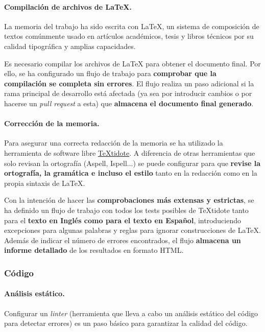 \paragraph*{Compilación de archivos de LaTeX.}

La memoria del trabajo ha sido escrita con LaTeX, un sistema de composición de textos comúnmente usado en artículos académicos, tesis y libros técnicos por su calidad tipográfica y amplias capacidades.

Es necesario compilar los archivos de LaTeX para obtener el documento final. Por ello, se ha configurado un flujo de trabajo para \textbf{comprobar que la compilación se completa sin errores}. El flujo realiza un paso adicional si la rama principal de desarrollo está afectada (ya sea por introducir cambios o por hacerse un \textit{pull request} a esta) que \textbf{almacena el documento final generado}.

\paragraph*{Corrección de la memoria.}

Para asegurar una correcta redacción de la memoria se ha utilizado la herramienta de software libre \href{https://github.com/sylvainhalle/textidote}{TeXtidote}. A diferencia de otras herramientas que solo revisan la ortografía (Aspell, Ispell...) se puede configurar para que \textbf{revise la ortografía, la gramática e incluso el estilo} tanto en la redacción como en la propia sintaxis de LaTeX.

Con la intención de hacer las \textbf{comprobaciones más extensas y estrictas}, se ha definido un flujo de trabajo con todos los tests posibles de TeXtidote tanto para el \textbf{texto en Inglés como para el texto en Español}, introduciendo excepciones para algunas palabras y reglas para ignorar construcciones de LaTeX. Además de indicar el número de errores encontrados, el flujo \textbf{almacena un informe detallado} de los resultados en formato HTML.


\subsubsection{Código}

\paragraph*{Análisis estático.}

Configurar un \textit{linter} (herramienta que lleva a cabo un análisis estático del código para detectar errores) es un paso básico para garantizar la calidad del código.

